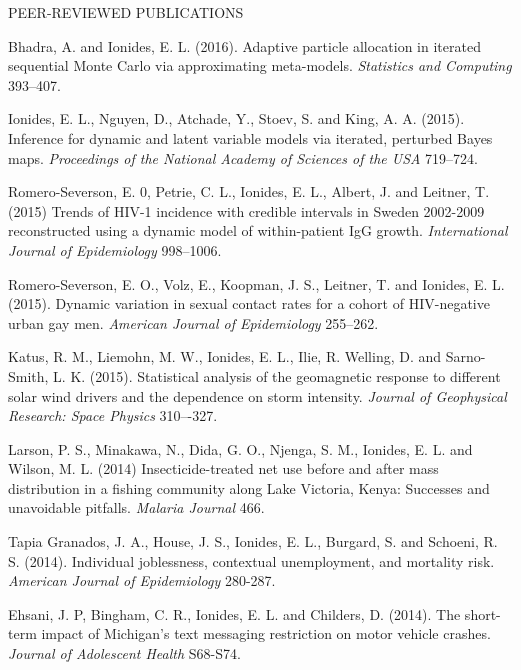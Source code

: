 \begin{reflist}{PEER-REVIEWED PUBLICATIONS}
\item
Bhadra, A. and Ionides, E. L. (2016). Adaptive particle allocation in iterated sequential Monte Carlo via approximating meta-models. {\em Statistics and Computing} {}{\separator}393--407.

\item Ionides, E. L., Nguyen, D., Atchade, Y., Stoev, S. and King, A. A. (2015). Inference for dynamic and latent variable models via iterated, perturbed Bayes maps.  {\em Proceedings of the National Academy of Sciences of the USA} {}{\separator}719--724.

\item Romero-Severson, E. 0, Petrie, C. L., Ionides, E. L., Albert, J. and Leitner, T. (2015) Trends of HIV-1 incidence with credible intervals in Sweden 2002-2009 reconstructed using a dynamic model of within-patient IgG growth. {\em International Journal of Epidemiology} {}{\separator}998--1006.


\item Romero-Severson, E. O., Volz, E., Koopman, J. S., Leitner, T. and Ionides, E. L. (2015). Dynamic variation in sexual contact rates for a cohort of HIV-negative urban gay men. {\em American Journal of Epidemiology}  {} 255--262.

\item
Katus, R. M., Liemohn,  M. W.,  Ionides, E. L., Ilie, R. Welling, D. and Sarno-Smith, L. K. (2015). Statistical analysis of the geomagnetic response to different solar wind drivers and the dependence on storm intensity. {\em Journal of Geophysical Research: Space Physics} {}{\separator}310–-327. 


\item
Larson, P. S., Minakawa,  N., Dida,  G. O., Njenga,  S. M., Ionides,  E. L. and Wilson,  M. L. (2014)
Insecticide-treated net use before and after mass distribution in a fishing community along Lake Victoria, Kenya: Successes and unavoidable pitfalls.
{\em Malaria Journal} {}{\separator}466. 

\item\formal{[[\tapiaPNAS] ]} 
Tapia Granados, J. A.,  House, J. S., Ionides, E. L., Burgard, S. and Schoeni, R. S. (2014). Individual joblessness, contextual unemployment, and mortality risk. {\em American Journal of Epidemiology}  {}{\separator}280-287.

\item\formal{[[\ehsani] ]} 
Ehsani, J. P, Bingham, C. R., Ionides, E. L. and Childers, D. (2014). The short-term impact of Michigan's text messaging restriction on motor vehicle crashes. {\it Journal of Adolescent Health}  {}{\separator}S68-S74.


\end{reflist}
